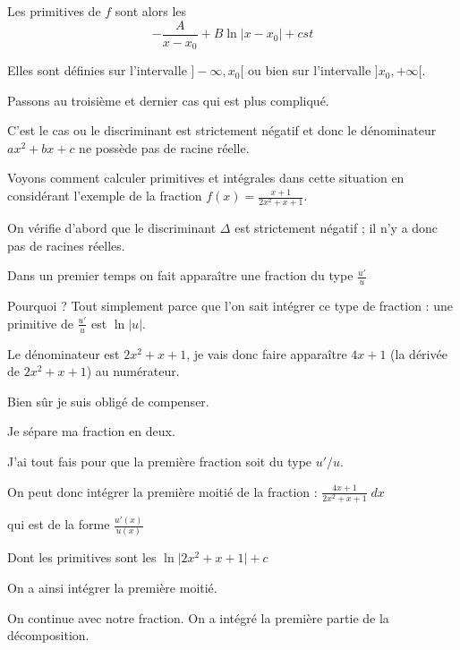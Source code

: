 Les primitives de $f$ sont alors les
$$-\frac{A}{x - x_0} + B\ln|x - x_0|+cst$$ 

Elles sont définies sur l'intervalle
$]-\infty,x_0[$ ou bien sur l'intervalle $]x_0,+\infty[$.

\diapo


Passons au troisième et dernier cas qui est plus compliqué.

C'est le cas ou le discriminant est strictement négatif 
et donc le dénominateur $a x^2+b x+c$ ne possède pas de racine réelle.


\change

Voyons comment calculer primitives et intégrales dans cette situation
en considérant l'exemple de la fraction 
$f(x)=\frac{x+1}{2x^2+x+1}$.

On vérifie d'abord que le discriminant $\Delta$ est strictement négatif ;
il n'y a donc pas de racines réelles.

\change

Dans un premier temps on fait apparaître une fraction du type $\frac{u'}{u}$ 

Pourquoi ? Tout simplement parce que l'on sait intégrer ce type de fraction :
une primitive de $\frac{u'}{u}$ est $\ln|u|$.

\change

Le dénominateur est $2x^2+x+1$, je vais donc faire apparaître $4x+1$ 
(la dérivée de $2x^2+x+1$) au numérateur.


Bien sûr je suis obligé de compenser.

\change

Je sépare ma fraction en deux.

\change

J'ai tout fais pour que la première fraction soit du type $u'/u$.

\change

On peut donc intégrer la première moitié de la fraction :
$\frac{4x+1}{2x^2+x+1} \; dx$

\change

qui est de la forme $\frac{u'(x)}{u(x)}$

\change

Dont les  primitives sont les 
$\ln \big| 2x^2+x+1 \big|+c$

On a ainsi intégrer la première moitié.


\diapo

On continue avec notre fraction.
On a intégré la première partie de la décomposition.

